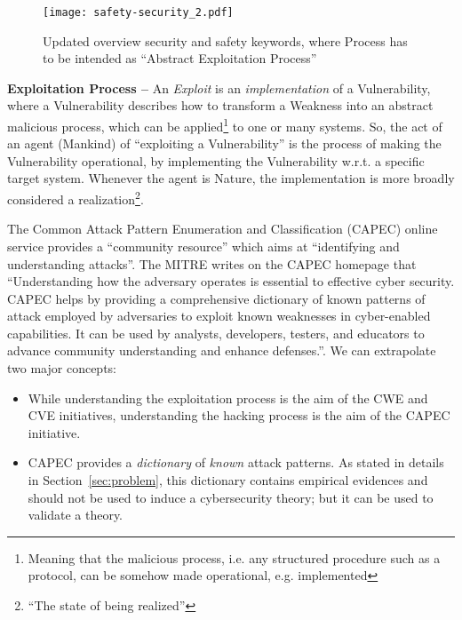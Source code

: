 \begin{figure}[t]
	\centering
	\texttt{[image: safety-security\_2.pdf]}
	\caption{Updated overview security and safety keywords, where Process
	has to be intended as ``Abstract Exploitation Process''}
	\label{fig:safety-security_2}
\end{figure}

\begin{definition}{\bf Exploitation Process --} An \emph{Exploit} is an \emph{implementation} of
a Vulnerability, where a Vulnerability describes how to transform a
Weakness into an abstract malicious process, which can be applied\footnote{Meaning that the
malicious process, i.e.  any structured procedure such as a protocol, can be
somehow made operational, e.g. implemented} to one or many systems. So, the act
of an agent (Mankind) of ``exploiting a Vulnerability'' is the process of
making the Vulnerability operational, by implementing the Vulnerability w.r.t.
a specific target system.  Whenever the agent is Nature, the implementation is
more broadly considered a realization\footnote{``The state of being
realized''\autocite{Merriam2020realization}}. 
\end{definition}

The Common Attack Pattern Enumeration and
Classification\autocite{MITRE2020CAPEC} (CAPEC) online service provides a
``community resource'' which aims at ``identifying and understanding attacks''.
The MITRE writes on the CAPEC homepage that ``Understanding how the adversary
operates is essential to effective cyber security. CAPEC helps by providing a
comprehensive dictionary of known patterns of attack employed by adversaries to
exploit known weaknesses in cyber-enabled capabilities. It can be used by
analysts, developers, testers, and educators to advance community understanding
and enhance defenses.''. We can extrapolate two major concepts: 
\begin{itemize}
	\item While understanding the exploitation process is the aim of the
		CWE and CVE initiatives, understanding the hacking process is
		the aim of the CAPEC initiative.
	\item CAPEC provides a \emph{dictionary} of \emph{known} attack patterns.
		As stated in details in Section~\ref{sec:problem}, this dictionary contains
		empirical evidences and should not be used to induce a cybersecurity 
		theory; but it can be used to validate a theory.
\end{itemize}

